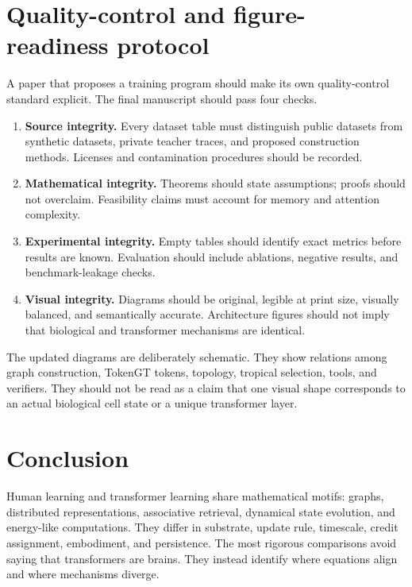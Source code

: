 \documentclass[11pt]{article}
\newcommand{\1}{\mathbf{1}}
\begin{document}
\section{Quality-control and figure-readiness protocol}
\label{sec:qa-protocol}

A paper that proposes a training program should make its own quality-control standard explicit. The final manuscript should pass four checks.

\begin{enumerate}
\item \textbf{Source integrity.} Every dataset table must distinguish public datasets from synthetic datasets, private teacher traces, and proposed construction methods. Licenses and contamination procedures should be recorded.
\item \textbf{Mathematical integrity.} Theorems should state assumptions; proofs should not overclaim. Feasibility claims must account for memory and attention complexity.
\item \textbf{Experimental integrity.} Empty tables should identify exact metrics before results are known. Evaluation should include ablations, negative results, and benchmark-leakage checks.
\item \textbf{Visual integrity.} Diagrams should be original, legible at print size, visually balanced, and semantically accurate. Architecture figures should not imply that biological and transformer mechanisms are identical.
\end{enumerate}

The updated diagrams are deliberately schematic. They show relations among graph construction, TokenGT tokens, topology, tropical selection, tools, and verifiers. They should not be read as a claim that one visual shape corresponds to an actual biological cell state or a unique transformer layer.


\section{Conclusion}

Human learning and transformer learning share mathematical motifs: graphs, distributed representations, associative retrieval, dynamical state evolution, and energy-like computations. They differ in substrate, update rule, timescale, credit assignment, embodiment, and persistence. The most rigorous comparisons avoid saying that transformers are brains. They instead identify where equations align and where mechanisms diverge.
\end{document}
